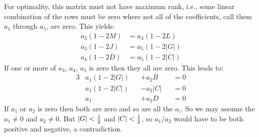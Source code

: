 For optimality, this matrix must not have maximum rank, i.e., some linear
combination of the rows must be zero where not all of the coefficients, call
them $a_1$ through $a_5$, are zero.  This yields:
\begin{align*}
a_3 (1-2M) &= a_4 (1-2L)   \\
a_3 (1-2J) &= a_5 (1-2|G|) \\
a_4 (1-2D) &= a_5 (1-2|C|)
\end{align*}
If one or more of $a_3$, $a_4$, $a_5$ is zero then they all are zero.  This
leads to:
\begin{alignat*}{3}
&a_1 (1-2|G|) &&+ a_2  B  &&= 0 \\
&a_1 (1-2|C|) &&- a_2 |C| &&= 0 \\
&a_1          &&+ a_2  D  &&= 0
\end{alignat*}
If $a_1$ or $a_2$ is zero then both are zero and so are all the $a_i$.  So we
may assume the $a_1 \neq 0$ and $a_2 \neq 0$.  But $|G| < \frac{1}{2}$ and
$|C| < \frac{1}{2}$, so $a_1/a_2$ would have to be both positive and negative,
a contradiction.

